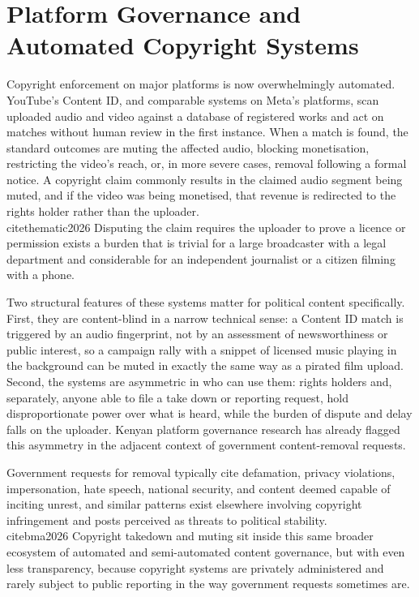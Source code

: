 \documentclass{article}
\begin{document}
\section{Platform Governance and Automated Copyright Systems}
\par
Copyright enforcement on major platforms is now overwhelmingly automated. YouTube’s Content ID, and comparable systems on Meta’s platforms, scan uploaded audio and video against a database of registered works and act on matches without human review in the first instance. When a match is found, the standard outcomes are muting the affected audio, blocking monetisation, restricting the video’s reach, or, in more severe cases, removal following a formal notice. A copyright claim commonly results in the claimed audio segment being muted, and if the video was being monetised, that revenue is redirected to the rights holder rather than the uploader. \\cite{thematic2026} Disputing the claim requires the uploader to prove a licence or permission exists a burden that is trivial for a large broadcaster with a legal department and considerable for an independent journalist or a citizen filming with a phone.
\par 
Two structural features of these systems matter for political content specifically. First, they are content-blind in a narrow technical sense: a Content ID match is triggered by an audio fingerprint, not by an assessment of newsworthiness or public interest, so a campaign rally with a snippet of licensed music playing in the background can be muted in exactly the same way as a pirated film upload. Second, the systems are asymmetric in who can use them: rights holders and, separately, anyone able to file a take down or reporting request, hold disproportionate power over what is heard, while the burden of dispute and delay falls on the uploader. Kenyan platform governance research has already flagged this asymmetry in the adjacent context of government content-removal requests.\par Government requests for removal typically cite defamation, privacy violations, impersonation, hate speech, national security, and content deemed capable of inciting unrest, and similar patterns exist elsewhere involving copyright infringement and posts perceived as threats to political stability. \\cite{bma2026} Copyright takedown and muting sit inside this same broader ecosystem of automated and semi-automated content governance, but with even less transparency, because copyright systems are privately administered and rarely subject to public reporting in the way government requests sometimes are.
\end{document}
